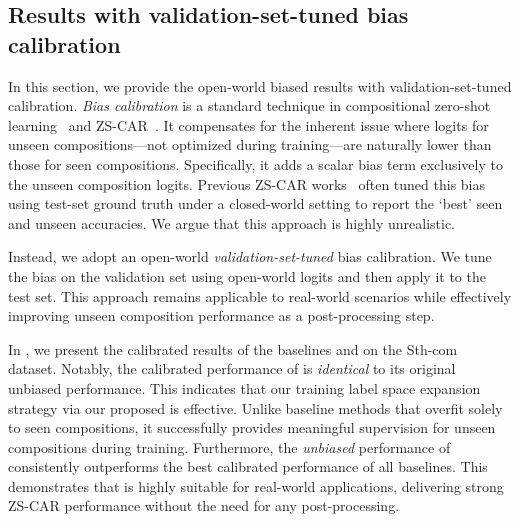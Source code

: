 \subsection{Results with validation-set-tuned bias calibration}

In this section, we provide the open-world biased results with validation-set-tuned calibration.
\textit{Bias calibration} is a standard technique in compositional zero-shot learning~\cite{purushwalkam2019taskdriven,mancini2021compcos,kim2023hierarchical,nayak2023csp, wu2025cond, li2024context} and ZS-CAR~\cite{li2024c2c,jiang2025dhd,jung2025crr,ye2025logic}. 
It compensates for the inherent issue where logits for unseen compositions---not optimized during training---are naturally lower than those for seen compositions. 
Specifically, it adds a scalar bias term exclusively to the unseen composition logits. 
Previous ZS-CAR works~\cite{li2024c2c,jiang2025dhd,jung2025crr,ye2025logic} often tuned this bias using test-set ground truth under a closed-world setting to report the `best' seen and unseen accuracies. 
We argue that this approach is highly unrealistic.

Instead, we adopt an open-world \textit{validation-set-tuned} bias calibration. 
We tune the bias on the validation set using open-world logits and then apply it to the test set. 
This approach remains applicable to real-world scenarios while effectively improving unseen composition performance as a post-processing step.

In , we present the calibrated results of the baselines and \ours{} on the Sth-com~\cite{li2024c2c} dataset. 
Notably, the calibrated performance of \ours{} is \textit{identical} to its original unbiased performance. 
This indicates that our training label space expansion strategy via our proposed \cpr{} is effective.
Unlike baseline methods that overfit solely to seen compositions, it successfully provides meaningful supervision for unseen compositions during training.
Furthermore, the \textit{unbiased} performance of \ours{} consistently outperforms the best calibrated performance of all baselines. 
This demonstrates that \ours{} is highly suitable for real-world applications, delivering strong ZS-CAR performance without the need for any post-processing.


